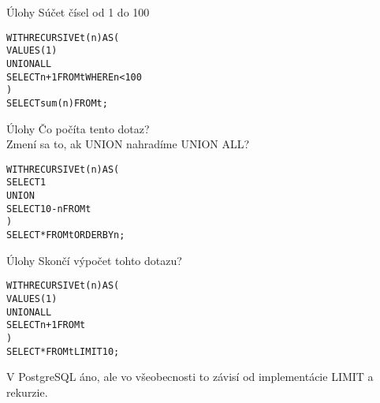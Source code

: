 \documentclass[12pt]{beamer}
\def\blue#1{\textcolor{Cerulean}{#1}}
\begin{document}
\begin{frame}[fragile]{Úlohy}
Súčet čísel od 1 do 100
\pause
\bigskip
{\small
\begin{alltt}
WITH RECURSIVE t(n) AS (
    VALUES (1)
  UNION ALL
    SELECT n+1 FROM t WHERE n < 100
)
SELECT sum(n) FROM t;
\end{alltt}
}
\end{frame}


\begin{frame}[fragile]{Úlohy}
Čo počíta tento dotaz?\\
Zmení sa to, ak UNION nahradíme UNION ALL?
\bigskip
{\small
\begin{alltt}
WITH RECURSIVE t(n) AS (
    SELECT 1
  \blue{UNION}
    SELECT 10-n FROM t
)
SELECT * FROM t ORDER BY n;
\end{alltt}
}
\end{frame}


\begin{frame}[fragile]{Úlohy}
Skončí výpočet tohto dotazu?
\bigskip
{\small
\begin{alltt}
WITH RECURSIVE t(n) AS (
    VALUES (1)
  UNION ALL
    SELECT n+1 FROM t
)
SELECT * FROM t LIMIT 10;
\end{alltt}
}
\bigskip
\pause
V PostgreSQL áno, ale vo všeobecnosti to závisí od implementácie LIMIT a rekurzie.
\end{frame}
\end{document}
